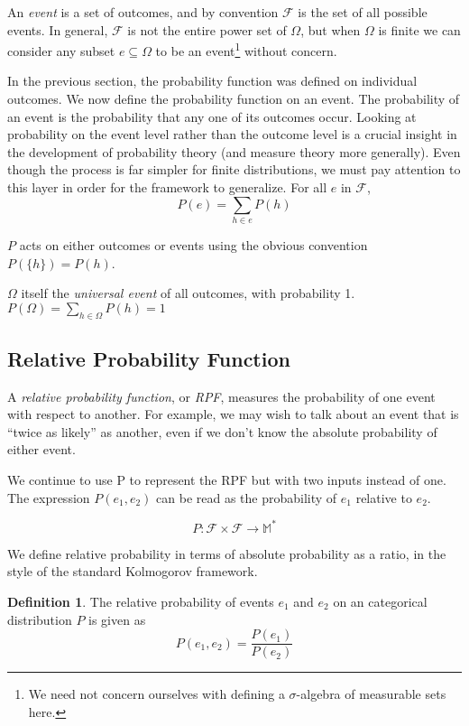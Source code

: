 \documentclass[twoside]{article}
\newcommand{\quotes}[1]{``#1''}
\theoremstyle{plain}%
\theoremstyle{definition}
\newtheorem{definition}{Definition}[section]
\theoremstyle{remark}
\begin{document}
An \textit{event} is a set of outcomes, and by convention \(\mathcal{F}\) is the set of all possible events. In general, \(\mathcal{F}\) is not the entire power set of \(\Omega\), but when \(\Omega\) is finite we can consider any subset \(e \subseteq \Omega\) to be an event\footnote{We need not concern ourselves with defining a \(\sigma\)-algebra of measurable sets here.} without concern.

In the previous section, the probability function was defined on individual outcomes. We now define the probability function on an event. The probability of an event is  the probability that any one of its outcomes occur. Looking at probability on the event level rather than the outcome level is a crucial insight in the development of probability theory (and measure theory more generally). Even though the process is far simpler for finite distributions, we must pay attention to this layer in order for the framework to generalize. For all \(e\) in \(\mathcal{F}\),
\[ P(e) = \sum_{h \in e}{P(h)}\]

\(P\) acts on either outcomes or events using the obvious convention \(P(\{h\}) = P(h)\).

\(\Omega\) itself the \textit{universal event} of all outcomes, with probability 1. \(P(\Omega) = \sum_{h \in \Omega}{P(h)} = 1\)

\subsection{Relative Probability Function}
\label{section:standard_relative_prob}

A \textit{relative probability function}, or \textit{RPF}, measures the probability of one event with respect to another. For example, we may wish to talk about an event that is \quotes{twice as likely} as another, even if we don't know the absolute probability of either event.

We continue to use P to represent the RPF but with two inputs instead of one. The expression \(P(e_1, e_2)\) can be read as the probability of \(e_1\) relative to \(e_2\).

\[P: \mathcal{F} \times \mathcal{F} \rightarrow \mathbb{M}^*\]

We define relative probability in terms of absolute probability as a ratio, in the style of the standard Kolmogorov framework.

\begin{definition}
\label{def:ratio}
The relative probability of events \(e_1\) and \(e_2\) on an categorical distribution \(P\) is given as
\[P(e_1, e_2) = \frac{P(e_1)}{P(e_2)}\]
\end{definition}
\end{document}
